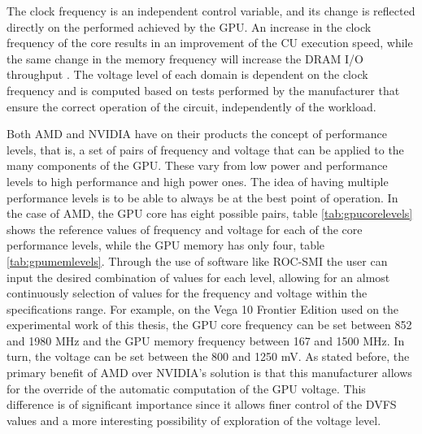 The clock frequency is an independent control variable, and its change is reflected directly on the performed achieved by the GPU. An increase in the clock frequency of the core results in an improvement of the CU execution speed, while the same change in the memory frequency will increase the DRAM I/O throughput \cite{mei_survey_2016}. The voltage level of each domain is dependent on the clock frequency and is computed based on tests performed by the manufacturer that ensure the correct operation of the circuit, independently of the workload.

Both AMD and NVIDIA have on their products the concept of performance levels, that is, a set of pairs of frequency and voltage that can be applied to the many components of the GPU. These vary from low power and performance levels to high performance and high power ones. The idea of having multiple performance levels is to be able to always be at the best point of operation.  In the case of AMD, the GPU core has eight possible pairs, table \ref{tab:gpucorelevels} shows the reference values of frequency and voltage for each of the core performance levels, while the GPU memory has only four, table \ref{tab:gpumemlevels}. Through the use of software like ROC-SMI \cite{noauthor_radeonopencompute/roc-smi_2019} the user can input the desired combination of values for each level, allowing for an almost continuously selection of values for the frequency and voltage within the specifications range. For example, on the Vega 10 Frontier Edition used on the experimental work of this thesis, the GPU core frequency can be set between 852 and 1980 MHz and the GPU memory frequency between 167 and 1500 MHz. In turn, the voltage can be set between the 800 and 1250 mV. As stated before, the primary benefit of AMD over NVIDIA's solution is that this manufacturer allows for the override of the automatic computation of the GPU voltage. This difference is of significant importance since it allows finer control of the DVFS values and a more interesting possibility of exploration of the voltage level.

